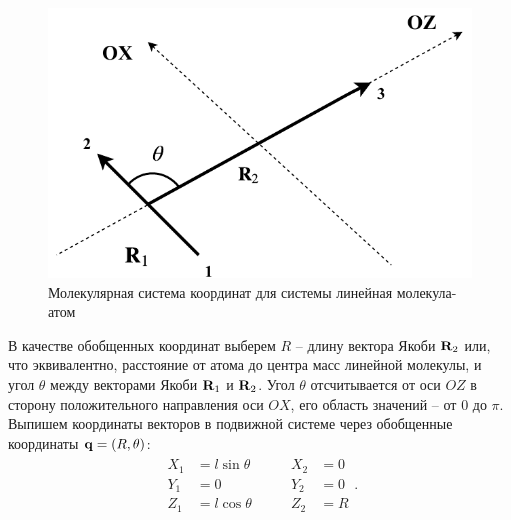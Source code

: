\begin{figure}[H]
    \centering
    \includegraphics[width=0.5\linewidth]{pictures/triatom_coordinates.pdf}
    \caption{Молекулярная система координат для системы линейная молекула-атом}
    \label{fig:body-fixed-linear-atom}
\end{figure}

В качестве обобщенных координат выберем $R$ -- длину вектора Якоби $\mathbf{R}_2$ или, что эквивалентно, расстояние от атома до центра масс линейной молекулы, и угол $\theta$ между векторами Якоби $\mathbf{R}_1$ и $\mathbf{R}_2$. Угол $\theta$ отсчитывается от оси $OZ$ в сторону положительного направления оси $OX$, его область значений -- от $0$ до $\pi$. Выпишем координаты векторов в подвижной системе через обобщенные координаты $\mathbf{q} = \left( R, \theta \right)$: 
\begin{gather}
    \begin{aligned}
        X_1 &= l \sin \theta \\
        Y_1 &= 0 \\
        Z_1 &= l \cos \theta
    \end{aligned} \qquad
    \begin{aligned}
        X_2 &= 0 \\ 
        Y_2 &= 0 \\
        Z_2 &= R 
    \end{aligned}. \label{linear-molecule-atom-jacobi-coords}
\end{gather}

